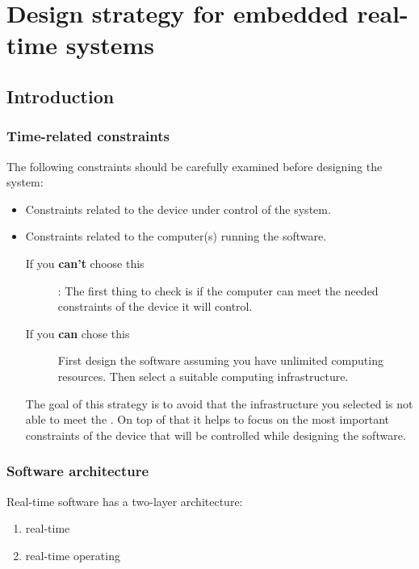 

\chapter{Design strategy for embedded real-time systems}

\section{Introduction}

\subsection{Time-related constraints}
The following constraints should be carefully examined before designing the system: 
\begin{itemize}
	\item Constraints related to the device under control of the system. 
	\item Constraints related to the computer(s) running the software. 
		\begin{description}
			\item[If you \textbf{can't} choose this]: The first thing to check is if the computer can meet the needed constraints of the device it will control.
				\item[If you \textbf{can}  chose this] First design the software assuming you have unlimited computing resources. Then select a suitable computing infrastructure.
		\end{description} 
		The goal of this strategy is to avoid that the infrastructure you selected is not able to meet the .
	On top of that it helps to focus on the most important constraints of the device that will be controlled while designing the software.
\end{itemize}




\subsection{Software architecture}
Real-time software has a two-layer architecture: 
\begin{enumerate}
	\item real-time 
	\item real-time operating 
\end{enumerate}

